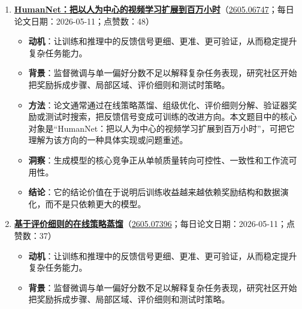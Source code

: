 \begin{enumerate}[leftmargin=1.5em]
\begin{itemize}[leftmargin=1.5em]
    \item \textbf{背景}：监督微调与单一偏好分数不足以解释复杂任务表现，研究社区开始把奖励拆成步骤、局部区域、评价细则和测试时策略。
    \item \textbf{方法}：论文通常通过在线策略蒸馏、组级优化、评价细则分解、验证器奖励或测试时搜索，把反馈信号变成可训练的改进方向。本文题目中的核心对象是“列表式策略优化：把组级可验证奖励强化学习看作回答单纯形上的目标投影”，可把它理解为该方向的一种具体实现或问题重述。
    \item \textbf{洞察}：奖励信号越能贴近任务结构，后训练越可能稳定地产生能力增益。
    \item \textbf{结论}：它的结论价值在于说明后训练收益越来越依赖奖励结构和数据演化，而不是只依赖更大的模型。
  \end{itemize}
  \item \textbf{\href{https://huggingface.co/papers/2605.06747}{HumanNet：把以人为中心的视频学习扩展到百万小时}}（\href{https://arxiv.org/abs/2605.06747}{2605.06747}；每日论文日期：2026-05-11；点赞数：48）
  \begin{itemize}[leftmargin=1.5em]
    \item \textbf{动机}：让训练和推理中的反馈信号更细、更准、更可验证，从而稳定提升复杂任务能力。
    \item \textbf{背景}：监督微调与单一偏好分数不足以解释复杂任务表现，研究社区开始把奖励拆成步骤、局部区域、评价细则和测试时策略。
    \item \textbf{方法}：论文通常通过在线策略蒸馏、组级优化、评价细则分解、验证器奖励或测试时搜索，把反馈信号变成可训练的改进方向。本文题目中的核心对象是“HumanNet：把以人为中心的视频学习扩展到百万小时”，可把它理解为该方向的一种具体实现或问题重述。
    \item \textbf{洞察}：生成模型的核心竞争正从单帧质量转向可控性、一致性和工作流可用性。
    \item \textbf{结论}：它的结论价值在于说明后训练收益越来越依赖奖励结构和数据演化，而不是只依赖更大的模型。
  \end{itemize}
  \item \textbf{\href{https://huggingface.co/papers/2605.07396}{基于评价细则的在线策略蒸馏}}（\href{https://arxiv.org/abs/2605.07396}{2605.07396}；每日论文日期：2026-05-11；点赞数：37）
  \begin{itemize}[leftmargin=1.5em]
    \item \textbf{动机}：让训练和推理中的反馈信号更细、更准、更可验证，从而稳定提升复杂任务能力。
    \item \textbf{背景}：监督微调与单一偏好分数不足以解释复杂任务表现，研究社区开始把奖励拆成步骤、局部区域、评价细则和测试时策略。

\end{itemize}
\end{enumerate}
